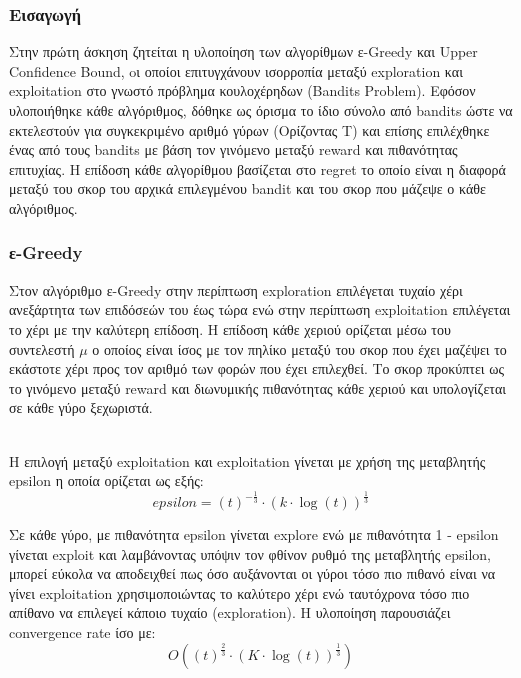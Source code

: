 \subsubsection*{Εισαγωγή}
Στην πρώτη άσκηση ζητείται η υλοποίηση των αλγορίθμων ε-Greedy και Upper Confidence Bound, oι οποίοι επιτυγχάνουν ισορροπία μεταξύ exploration και exploitation στο γνωστό πρόβλημα κουλοχέρηδων (Bandits Problem). Εφόσον υλοποιήθηκε κάθε αλγόριθμος, δόθηκε ως όρισμα το ίδιο σύνολο από bandits ώστε να εκτελεστούν για συγκεκριμένο αριθμό γύρων (Ορίζοντας Τ) και επίσης επιλέχθηκε ένας από τους bandits με βάση τον γινόμενο μεταξύ reward και πιθανότητας επιτυχίας. Η επίδοση κάθε αλγορίθμου βασίζεται στο regret το οποίο είναι η διαφορά μεταξύ του σκορ του αρχικά επιλεγμένου bandit και του σκορ που μάζεψε ο κάθε αλγόριθμος.  

\subsubsection*{ε-Greedy}
\noindent
Στον αλγόριθμο ε-Greedy στην περίπτωση exploration επιλέγεται τυχαίο χέρι ανεξάρτητα των επιδόσεών του έως τώρα ενώ στην περίπτωση exploitation επιλέγεται το χέρι με την καλύτερη επίδοση. Η επίδοση κάθε χεριού ορίζεται μέσω του συντελεστή $\mu$ ο οποίος είναι ίσος με τον πηλίκο μεταξύ του σκορ που έχει μαζέψει το εκάστοτε χέρι προς τον αριθμό των φορών που έχει επιλεχθεί. Το σκορ προκύπτει ως το γινόμενο μεταξύ reward και διωνυμικής πιθανότητας κάθε χεριού και υπολογίζεται σε κάθε γύρο ξεχωριστά. 

\noindent\\
Η επιλογή μεταξύ exploitation και exploitation γίνεται με χρήση της μεταβλητής epsilon η οποία ορίζεται ως εξής:
\begin{equation*}
	epsilon = (t)^{-\frac{1}{3}} \cdot (k \cdot \log(t))^{\frac{1}{3}}
\end{equation*}

\noindent
Σε κάθε γύρο, με πιθανότητα epsilon γίνεται explore ενώ με πιθανότητα 1 - epsilon γίνεται exploit και λαμβάνοντας υπόψιν τον φθίνον ρυθμό της μεταβλητής epsilon, μπορεί εύκολα να αποδειχθεί πως όσο αυξάνονται οι γύροι τόσο πιο πιθανό είναι να γίνει exploitation χρησιμοποιώντας το καλύτερο χέρι ενώ ταυτόχρονα τόσο πιο απίθανο να επιλεγεί κάποιο τυχαίο (exploration). Η υλοποίηση παρουσιάζει convergence rate ίσο με:
\begin{equation}
	O\left( (t)^{\frac{2}{3}} \cdot (K \cdot \log(t))^{\frac{1}{3}} \right)
\end{equation}



